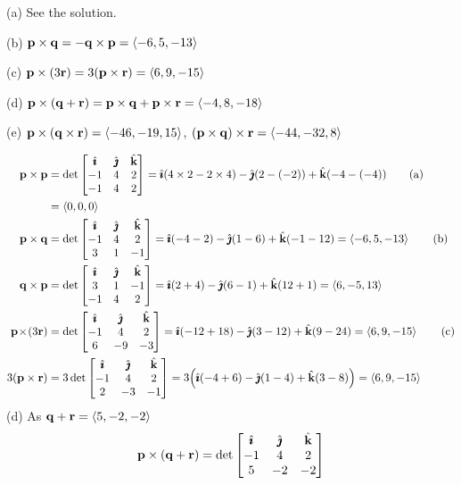 
\begin{answer}
(a) See the solution.

(b) $\mathbf{p}\times\mathbf{q} = -\mathbf{q}\times\mathbf{p} = \left< -6,5,-13\right>$

(c) $\mathbf{p} \times (3\mathbf{r}) = 3(\mathbf{p}\times\mathbf{r}) =  \left< 6,9,-15\right>$

(d) $\mathbf{p}\times(\mathbf{q}+\mathbf{r}) = \mathbf{p}\times\mathbf{q}+\mathbf{p}\times\mathbf{r} =  \left< -4,8,-18\right>$ 

(e) $\mathbf{p}\times(\mathbf{q}\times\mathbf{r}) = \left< -46,-19,15\right>$,
    $(\mathbf{p}\times\mathbf{q})\times\mathbf{r} = \left< -44,-32,8\right>$

\end{answer}

\begin{solution}
\leqnomode
\begin{align}
\vp\times\vp 
&= \det\left[ \begin{matrix}\hi&\hj&\hk\cr-1&4&2\cr-1&4&2\end{matrix}\right]
=\hi(4\times2-2\times4)-\hj(2-(-2))
+\hk(-4-(-4)) \tag{a} \\
&= \llt 0,0,0\rgt \notag \\
%
\vp\times\vq 
&= \det\left[ \begin{matrix}\hi&\hj&\hk\cr-1&4&2\cr3&1&-1\end{matrix}\right]
=\hi(-4-2)-\hj(1-6)
+\hk(-1-12) 
= \llt -6,5,-13\rgt \tag{b} \\
\vq\times\vp 
&= \det\left[ \begin{matrix}\hi&\hj&\hk\cr3&1&-1\cr-1&4&2\end{matrix}\right]
=\hi(2+4)-\hj(6-1)
+\hk(12+1) 
= \llt 6,-5,13\rgt \notag \\
%
\vp\!\times\!(3\vr) 
&= \det\left[ \begin{matrix}\hi&\hj&\hk\cr-1&4&2\cr6&-9&-3\end{matrix}\right]
=\hi(-12+18)-\hj(3-12)
+\hk(9-24) 
= \llt 6,9,-15\rgt \tag{c} \\
3(\vp\times\vr) 
&= 3\det\left[ \begin{matrix}\hi&\hj&\hk\cr-1&4&2\cr2&-3&-1\end{matrix}\right]
=3\Big(\hi(-4+6)-\hj(1-4)
+\hk(3-8) \Big)
= \llt 6,9,-15\rgt \notag
\end{align}
(d) As $\mathbf{q}+\mathbf{r}=\left< 5,-2,-2\right> $
\begin{align*}
\vp\times(\vq+\vr)
= \det\left[\begin{matrix}\hi&\hj&\hk\cr-1&4&2\cr5&-2&-2\end{matrix}\right]

\end{align*}
\end{solution}

